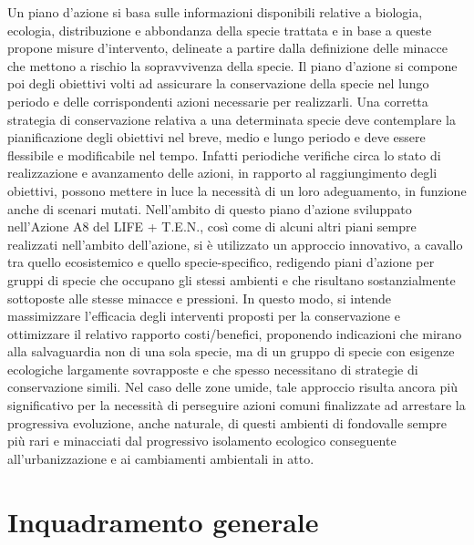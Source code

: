 \documentclass[10pt,twoside,openany,x11names,svgnames,italian,a5paper,dvipsnames,table]{memoir}
\newcommand\chapterillustration{}
\begin{document}
Un piano d’azione si basa sulle informazioni disponibili relative a biologia, ecologia, distribuzione e abbondanza della specie trattata e in base a queste propone misure d’intervento, delineate a partire dalla definizione delle minacce che mettono a rischio la sopravvivenza della specie. Il piano d’azione si compone poi degli obiettivi volti ad assicurare la conservazione della specie nel lungo periodo e delle corrispondenti azioni necessarie per realizzarli.
Una corretta strategia di conservazione relativa a una determinata specie deve contemplare la pianificazione degli obiettivi nel breve, medio e lungo periodo e deve essere flessibile e modificabile nel tempo. Infatti periodiche verifiche circa lo stato di realizzazione e avanzamento delle azioni, in rapporto al raggiungimento degli obiettivi, possono mettere in luce la necessità di un loro adeguamento, in funzione anche di scenari mutati.
Nell'ambito di questo piano d'azione sviluppato nell'Azione A8 del LIFE + T.E.N., così come di alcuni altri piani sempre realizzati nell'ambito dell'azione, si è utilizzato un approccio innovativo, a cavallo tra quello ecosistemico e quello specie-specifico, redigendo piani d'azione per gruppi di specie che occupano gli stessi ambienti e che risultano sostanzialmente sottoposte alle stesse minacce e pressioni. In questo modo, si intende massimizzare l'efficacia degli interventi proposti per la conservazione e ottimizzare il relativo rapporto costi/benefici, proponendo indicazioni che mirano alla salvaguardia non di una sola specie, ma di un gruppo di specie con esigenze ecologiche largamente sovrapposte e che spesso necessitano di strategie di conservazione simili.
Nel caso delle zone umide, tale approccio risulta ancora più significativo per la necessità di perseguire azioni comuni finalizzate ad arrestare la progressiva evoluzione, anche naturale, di questi ambienti di fondovalle sempre più rari e minacciati dal progressivo isolamento ecologico conseguente all’urbanizzazione e ai cambiamenti ambientali in atto.


  
\setlength\afterchapskip{52mm}
\normalsize
\chapter{Inquadramento generale}
\renewcommand\chapterillustration{1.JPG}
\end{document}

